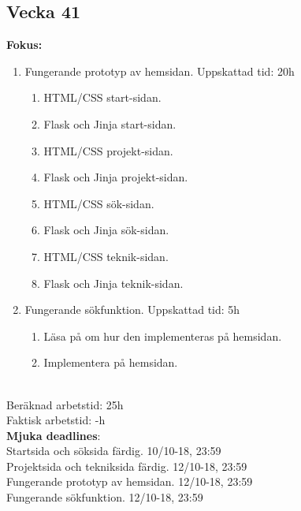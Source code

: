 \documentclass{TDP003mall}
\begin{document}
\subsection{Vecka 41}
\textbf{Fokus:}
\begin{enumerate}
    \item Fungerande prototyp av hemsidan. Uppskattad tid: 20h
    \begin{enumerate}
      \item HTML/CSS start-sidan.
      \item Flask och Jinja start-sidan.
      \item HTML/CSS projekt-sidan.
      \item Flask och Jinja projekt-sidan.
      \item HTML/CSS sök-sidan.
      \item Flask och Jinja sök-sidan.
      \item HTML/CSS teknik-sidan.
      \item Flask och Jinja teknik-sidan.
    \end{enumerate}
    \item Fungerande sökfunktion. Uppskattad tid: 5h
    \begin{enumerate}
      \item Läsa på om hur den implementeras på hemsidan.
      \item Implementera på hemsidan.
    \end{enumerate}
\end{enumerate}
\\
Beräknad arbetstid: 25h\\
Faktisk arbetstid: -h\\

\textbf{Mjuka deadlines}:\\
Startsida och söksida färdig. 10/10-18, 23:59\\
Projektsida och tekniksida färdig. 12/10-18, 23:59\\
Fungerande prototyp av hemsidan. 12/10-18, 23:59\\
Fungerande sökfunktion. 12/10-18, 23:59\\
\end{document}

